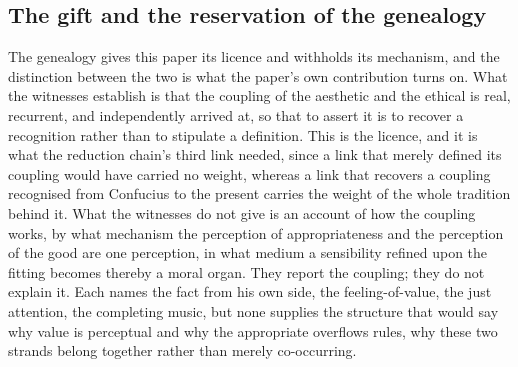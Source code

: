 \subsection{The gift and the reservation of the genealogy}
\label{p22:sub:gen-contribution}

The genealogy gives this paper its licence and withholds its mechanism, and the distinction between the two is what the paper's own contribution turns on. What the witnesses establish is that the coupling of the aesthetic and the ethical is real, recurrent, and independently arrived at, so that to assert it is to recover a recognition rather than to stipulate a definition. This is the licence, and it is what the reduction chain's third link needed, since a link that merely defined its coupling would have carried no weight, whereas a link that recovers a coupling recognised from Confucius to the present carries the weight of the whole tradition behind it. What the witnesses do not give is an account of how the coupling works, by what mechanism the perception of appropriateness and the perception of the good are one perception, in what medium a sensibility refined upon the fitting becomes thereby a moral organ. They report the coupling; they do not explain it. Each names the fact from his own side, the feeling-of-value, the just attention, the completing music, but none supplies the structure that would say why value is perceptual and why the appropriate overflows rules, why these two strands belong together rather than merely co-occurring.


